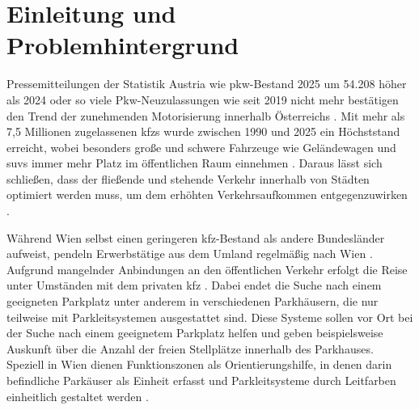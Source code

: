\section{Einleitung und Problemhintergrund}

Pressemitteilungen der Statistik Austria wie \glqq \acs{pkw}-Bestand 2025 um 54.208 höher als 2024\grqq{} oder  so viele Pkw-Neuzulassungen wie seit 2019 nicht mehr\grqq{} bestätigen den Trend der zunehmenden Motorisierung innerhalb Österreichs \parencites[S. 1]{statistikaustriaPkwBestand2025Um2026}[S. 1]{statistikaustria2025VielePkwNeuzulassungen2026}. 
Mit mehr als 7,5 Millionen zugelassenen \acp{kfz} wurde zwischen 1990 und 2025 ein Höchststand erreicht, wobei besonders große und schwere Fahrzeuge wie Geländewagen und \acp{suv} immer mehr Platz im öffentlichen Raum einnehmen \parencite{hatzlDatenZeigenImmer2025}. 
Daraus lässt sich schließen, dass der fließende und stehende Verkehr innerhalb von Städten optimiert werden muss, um dem erhöhten Verkehrsaufkommen entgegenzuwirken \parencite{jaschinskyWarumOsterreichsStadte2025}. 

Während Wien selbst einen geringeren \acs{kfz}-Bestand als andere Bundesländer aufweist, pendeln Erwerbstätige aus dem Umland regelmäßig nach Wien \parencite{statistikaustriaKfzBestand2026}. 
Aufgrund mangelnder Anbindungen an den öffentlichen Verkehr erfolgt die Reise unter Umständen mit dem privaten \acs{kfz} \parencite{aknoAKNiederosterreichPendleranalyse20252025}. 
Dabei endet die Suche nach einem geeigneten Parkplatz unter anderem in verschiedenen Parkhäusern, die nur teilweise mit Parkleitsystemen ausgestattet sind. Diese Systeme sollen vor Ort bei der Suche nach einem geeignetem Parkplatz helfen und geben beispielsweise Auskunft über die Anzahl der freien Stellplätze innerhalb des Parkhauses. Speziell in Wien dienen Funktionszonen als Orientierungshilfe, in denen darin befindliche Parkäuser als Einheit erfasst und Parkleitsysteme durch Leitfarben einheitlich gestaltet werden \parencite{stadtwienParkleitsystemFuerWien2026}. 


